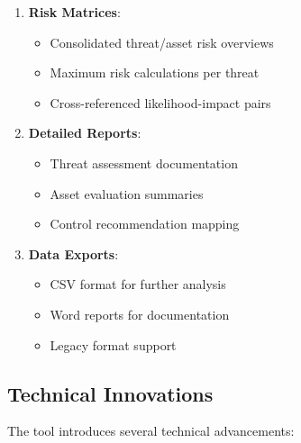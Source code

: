 \documentclass[binding=0.6cm]{sapthesis}
\begin{document}
\begin{enumerate}
\item \textbf{Risk Matrices}:
\begin{itemize}
\item Consolidated threat/asset risk overviews
\item Maximum risk calculations per threat
\item Cross-referenced likelihood-impact pairs
\end{itemize}

\item \textbf{Detailed Reports}:
\begin{itemize}
    \item Threat assessment documentation
    \item Asset evaluation summaries
    \item Control recommendation mapping
\end{itemize}

\item \textbf{Data Exports}:
\begin{itemize}
    \item CSV format for further analysis
    \item Word reports for documentation
    \item Legacy format support
\end{itemize}
\end{enumerate}

\subsection{Technical Innovations}

The tool introduces several technical advancements:
\end{document}
